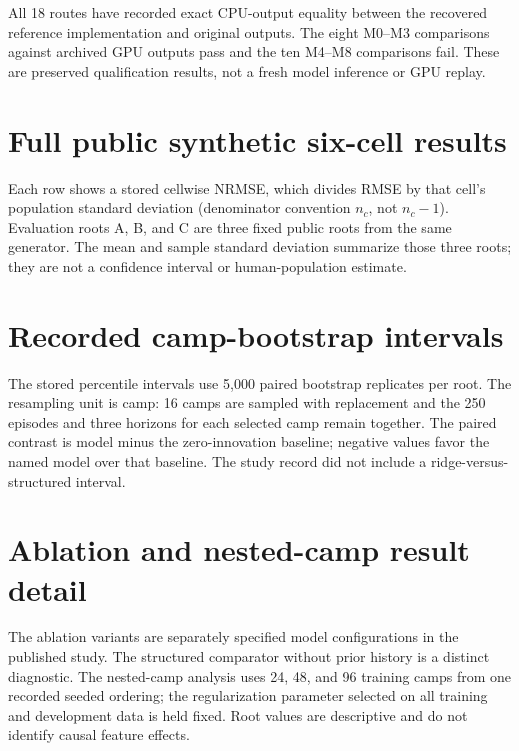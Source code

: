 \documentclass[10pt,a4paper]{article}
\begin{document}


All 18 routes have recorded exact CPU-output equality between the recovered reference implementation and original outputs. The eight M0--M3 comparisons against archived GPU outputs pass and the ten M4--M8 comparisons fail. These are preserved qualification results, not a fresh model inference or GPU replay.

\section{Full public synthetic six-cell results}

Each row shows a stored cellwise NRMSE, which divides RMSE by that cell's population standard deviation (denominator convention \(n_c\), not \(n_c-1\)). Evaluation roots A, B, and C are three fixed public roots from the same generator. The mean and sample standard deviation summarize those three roots; they are not a confidence interval or human-population estimate.



\section{Recorded camp-bootstrap intervals}

The stored percentile intervals use 5,000 paired bootstrap replicates per root. The resampling unit is camp: 16 camps are sampled with replacement and the 250 episodes and three horizons for each selected camp remain together. The paired contrast is model minus the zero-innovation baseline; negative values favor the named model over that baseline. The study record did not include a ridge-versus-structured interval.



\section{Ablation and nested-camp result detail}

The ablation variants are separately specified model configurations in the published study. The structured comparator without prior history is a distinct diagnostic. The nested-camp analysis uses 24, 48, and 96 training camps from one recorded seeded ordering; the regularization parameter selected on all training and development data is held fixed. Root values are descriptive and do not identify causal feature effects.
\end{document}
